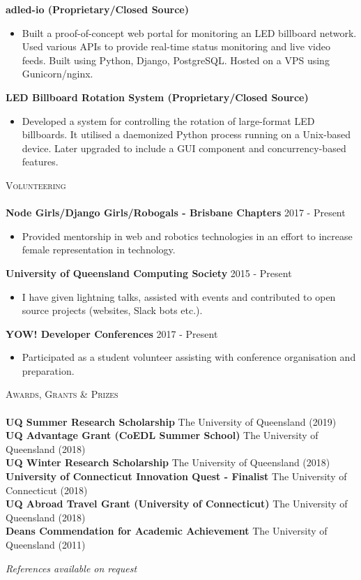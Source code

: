 \documentclass[a4paper]{article}
\newcommand{\lineunder} {
    \vspace*{-8pt} \\
    \hspace*{-10pt} \hrulefill \\
}
\newcommand{\header} [1] {
    {\hspace*{-10pt}\vspace*{6pt} \textsc{#1}}
    \vspace*{-6pt} \lineunder
}
\newenvironment{singleitem}
{   \small
    \vspace{-2.6pt}
    \begin{itemize}
    \setlength{\itemsep}{0pt}
    \setlength{\parskip}{0pt}
    \setlength{\parsep}{0pt}   }
{\end{itemize} \vspace{-2.6pt}	}
\begin{document}
\textbf{adled-io (Proprietary/Closed Source)}
\begin{singleitem}
	\item Built a proof-of-concept web portal for monitoring an LED billboard network. Used various APIs to provide real-time status monitoring and live video feeds. Built using Python, Django, PostgreSQL. Hosted on a VPS using Gunicorn/nginx.
\end{singleitem}

\textbf{LED Billboard Rotation System (Proprietary/Closed Source)}
\begin{singleitem}
	\item Developed a system for controlling the rotation of large-format LED billboards. It utilised a daemonized Python process running on a Unix-based device. Later upgraded to include a GUI component and concurrency-based features.
\end{singleitem}

\vspace{0mm}

\header{Volunteering}
\textbf{Node Girls/Django Girls/Robogals - Brisbane Chapters} \hfill 2017 - Present\\
\begin{singleitem}
	\item Provided mentorship in web and robotics technologies in an effort to increase female representation in technology.
\end{singleitem}
\textbf{University of Queensland Computing Society} \hfill 2015 - Present\\
\begin{singleitem}
	\item I have given lightning talks, assisted with events and contributed to open source projects (websites, Slack bots etc.).
\end{singleitem}
\textbf{YOW! Developer Conferences} \hfill 2017 - Present\\
\begin{singleitem}
	\item Participated as a student volunteer assisting with conference organisation and preparation.
\end{singleitem}

\header{Awards, Grants \& Prizes}
\textbf{UQ Summer Research Scholarship} \hfill The University of Queensland (2019)\\
\textbf{UQ Advantage Grant (CoEDL Summer School)} \hfill The University of Queensland (2018)\\
\textbf{UQ Winter Research Scholarship} \hfill The University of Queensland (2018)\\
\textbf{University of Connecticut Innovation Quest - Finalist} \hfill The University of Connecticut (2018)\\
\textbf{UQ Abroad Travel Grant (University of Connecticut)} \hfill The University of Queensland (2018)\\
\textbf{Dean\textquotesingle{}s Commendation for Academic Achievement} \hfill The University of Queensland (2011)\\


\vspace{3mm}
\begin{center}
\small \textit{References available on request}
\end{center}
\end{document}
